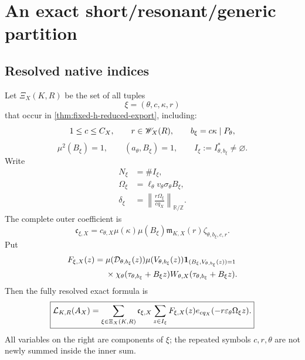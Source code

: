 \section{An exact short/resonant/generic partition}
\label{sec:sector-partition}

\subsection{Resolved native indices}

Let \(\Xi_X(K,R)\) be the set of all tuples
\begin{equation}
 \xi=(\theta,c,\kappa,r)
\label{eq:sector-index}
\end{equation}
that occur in \cref{thm:fixed-h-reduced-export}, including:
\[
 1\le c\le C_X,\qquad
 r\in\mathscr W_X(R),\qquad
 b_\xi=c\kappa\mid P_\theta,
\]
\[
 \mu^2(B_\xi)=1,\qquad
 (a_\theta,B_\xi)=1,\qquad
 I_\xi:=I_{\theta,b_\xi}^\ast\ne\varnothing.
\]
Write
\begin{align}
 N_\xi&=\#I_\xi,
\label{eq:sector-occupancy}\\
 \Omega_\xi
 &=
 \ell_\theta v_\theta\sigma_\theta B_\xi,
\label{eq:sector-phase-slope}\\
 \delta_\xi
 &=
 \left\|
 \frac{r\Omega_\xi}{cq_X}
 \right\|_{\mathbb R/\mathbb Z}.
\label{eq:sector-phase-distance}
\end{align}
The complete outer coefficient is
\begin{equation}
 \mathfrak c_{\xi,X}
 =
 c_{\theta,X}\mu(\kappa)\mu(B_\xi)
 \mathfrak m_{K,X}(r)
 \zeta_{\theta,b_\xi,c,r}.
\label{eq:sector-outer-coefficient}
\end{equation}
Put
\begin{align}
 F_{\xi,X}(z)
 ={}&
 \mu(\mathcal D_{\theta,b_\xi}(z))
 \mu(V_{\theta,b_\xi}(z))
 \mathbf 1_{(B_\xi,V_{\theta,b_\xi}(z))=1}
 \notag\\
 &\times
 \chi_\theta(\tau_{\theta,b_\xi}+B_\xi z)
 W_{\theta,X}(\tau_{\theta,b_\xi}+B_\xi z).
\label{eq:sector-inner-coefficient}
\end{align}
Then the fully resolved exact formula is
\begin{equation}
 \boxed{
 \mathcal L_{K,R}(A_X)
 =
 \sum_{\xi\in\Xi_X(K,R)}
 \mathfrak c_{\xi,X}
 \sum_{z\in I_\xi}
 F_{\xi,X}(z)
 e_{cq_X}(-r\varepsilon_\theta\Omega_\xi z).}
\label{eq:sector-master-formula}
\end{equation}
All variables on the right are components of \(\xi\); the repeated
symbols \(c,r,\theta\) are not newly summed inside the inner sum.

